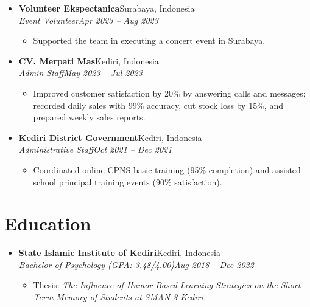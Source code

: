 \documentclass[10pt,letterpaper]{article}
\newcommand{\entry}[4]{\vspace{2pt}\item \textbf{#1}\hfill #2\\[-1pt] \textit{#3}\hfill \textit{#4}}
\begin{document}
\begin{itemize}
\begin{itemize}
\item Tracked analytics in TikTok, Instagram, and Meta Business Suite; replied to comments and DMs within 12 hours.
\item Ran KOL, influencer, and affiliate campaigns and coordinated an IELTS launch webinar with 400 participants.
\item Ranked top 3 in Creative Department KPIs for follower growth, content performance, and audience management; nominated Most Evolve Employee (Galaversary 2024).
\end{itemize}
\entry{Volunteer Ekspectanica}{Surabaya, Indonesia}{Event Volunteer}{Apr 2023 -- Aug 2023}
\begin{itemize}
\item Supported the team in executing a concert event in Surabaya.
\end{itemize}
\entry{CV. Merpati Mas}{Kediri, Indonesia}{Admin Staff}{May 2023 -- Jul 2023}
\begin{itemize}
\item Improved customer satisfaction by 20\% by answering calls and messages; recorded daily sales with 99\% accuracy, cut stock loss by 15\%, and prepared weekly sales reports.
\end{itemize}
\entry{Kediri District Government}{Kediri, Indonesia}{Administrative Staff}{Oct 2021 -- Dec 2021}
\begin{itemize}
\item Coordinated online CPNS basic training (95\% completion) and assisted school principal training events (90\% satisfaction).
\end{itemize}
\end{itemize}

\section{Education}
\begin{itemize}
\entry{State Islamic Institute of Kediri}{Kediri, Indonesia}{Bachelor of Psychology (GPA: 3.48/4.00)}{Aug 2018 -- Dec 2022}
\begin{itemize}
\item Thesis: \textit{The Influence of Humor-Based Learning Strategies on the Short-Term Memory of Students at SMAN 3 Kediri.}
\end{itemize}
\end{itemize}
\end{document}
